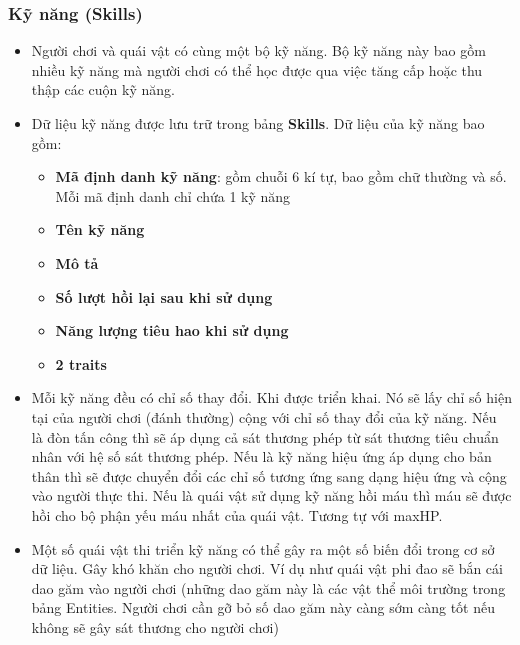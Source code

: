 \subsubsection{Kỹ năng (Skills)}
\begin{itemize}
	\item Người chơi và quái vật có cùng một bộ kỹ năng. Bộ kỹ năng này bao gồm nhiều kỹ năng mà người chơi có thể học được qua việc tăng cấp hoặc thu thập các cuộn kỹ năng. 
	\item Dữ liệu kỹ năng được lưu trữ trong bảng \textbf{Skills}. Dữ liệu của kỹ năng bao gồm:
	\begin{itemize}
		\item \textbf{Mã định danh kỹ năng}: gồm chuỗi 6 kí tự, bao gồm chữ thường và số. Mỗi mã định danh chỉ chứa 1 kỹ năng
		\item \textbf{Tên kỹ năng}
		\item \textbf{Mô tả}
		\item \textbf{Số lượt hồi lại sau khi sử dụng}
		\item \textbf{Năng lượng tiêu hao khi sử dụng}
		\item \textbf{2 traits}
	\end{itemize}
	\item Mỗi kỹ năng đều có chỉ số thay đổi. Khi được triển khai. Nó sẽ lấy chỉ số hiện tại của người chơi (đánh thường) cộng với chỉ số thay đổi của kỹ năng. Nếu là đòn tấn công thì sẽ áp dụng cả sát thương phép từ sát thương tiêu chuẩn nhân với hệ số sát thương phép. Nếu là kỹ năng hiệu ứng áp dụng cho bản thân thì sẽ được chuyển đổi các chỉ số tương ứng sang dạng hiệu ứng và cộng vào người thực thi. Nếu là quái vật sử dụng kỹ năng hồi máu thì máu sẽ được hồi cho bộ phận yếu máu nhất của quái vật. Tương tự với maxHP.
	\item Một số quái vật thi triển kỹ năng có thể gây ra một số biến đổi trong cơ sở dữ liệu. Gây khó khăn cho người chơi. Ví dụ như quái vật phi đao sẽ bắn cái dao găm vào người chơi (những dao găm này là các vật thể môi trường trong bảng Entities. Người chơi cần gỡ bỏ số dao găm này càng sớm càng tốt nếu không sẽ gây sát thương cho người chơi)
\end{itemize}

